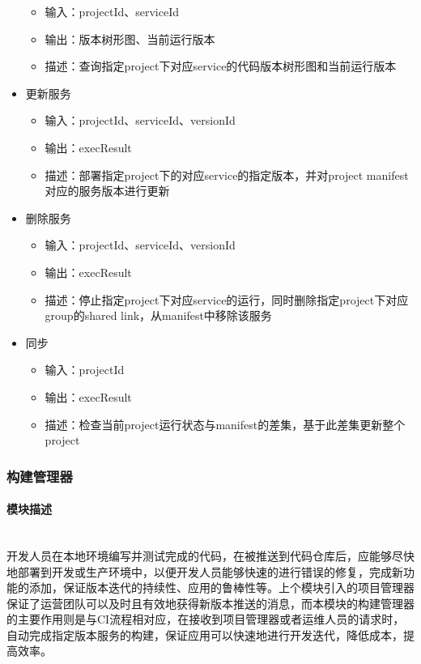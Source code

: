 \documentclass[a4paper, 12pt]{article}
\theoremstyle{definition}
\begin{document}
\begin{itemize}
{\begin{itemize}
		\item 输入：projectId、serviceId
		\item 输出：版本树形图、当前运行版本
		\item 描述：查询指定project下对应service的代码版本树形图和当前运行版本
		\end{itemize}}
	\item{更新服务
		\begin{itemize}
		\item 输入：projectId、serviceId、versionId
		\item 输出：execResult
		\item 描述：部署指定project下的对应service的指定版本，并对project manifest对应的服务版本进行更新
		\end{itemize}}
	\item{删除服务
		\begin{itemize}
		\item 输入：projectId、serviceId、versionId
		\item 输出：execResult
		\item 描述：停止指定project下对应service的运行，同时删除指定project下对应group的shared link，从manifest中移除该服务
		\end{itemize}}
	\item{同步
		\begin{itemize}
		\item 输入：projectId
		\item 输出：execResult
		\item 描述：检查当前project运行状态与manifest的差集，基于此差集更新整个project
		\end{itemize}}
\end{itemize}

\subsubsection{构建管理器}
\paragraph{模块描述}\mbox{}\\

开发人员在本地环境编写并测试完成的代码，在被推送到代码仓库后，应能够尽快地部署到开发或生产环境中，以便开发人员能够快速的进行错误的修复，完成新功能的添加，保证版本迭代的持续性、应用的鲁棒性等。上个模块引入的项目管理器保证了运营团队可以及时且有效地获得新版本推送的消息，而本模块的构建管理器的主要作用则是与CI流程相对应，在接收到项目管理器或者运维人员的请求时，自动完成指定版本服务的构建，保证应用可以快速地进行开发迭代，降低成本，提高效率。
\end{document}
